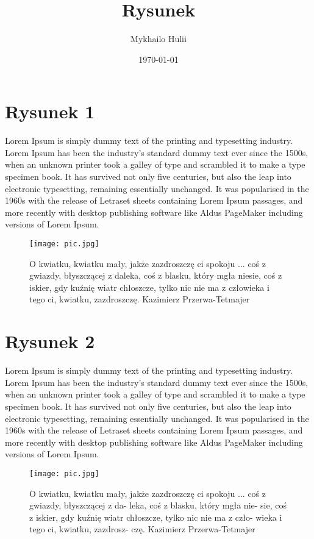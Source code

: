 \documentclass[a4paper,12pt]{article}
\title{Rysunek}
\author{Mykhailo Hulii}
\date{\today}
\begin{document}
	\maketitle
	
	
	\section{Rysunek 1}
	Lorem Ipsum is simply dummy text of the printing and typesetting industry. Lorem Ipsum has been the industry's standard dummy text ever since the 1500s, when an unknown printer took a galley of type and scrambled it to make a type specimen book. It has survived not only five centuries, but also the leap into electronic typesetting, remaining essentially unchanged. It was popularised in the 1960s with the release of Letraset sheets containing Lorem Ipsum passages, and more recently with desktop publishing software like Aldus PageMaker including versions of Lorem Ipsum.
	\begin{figure}[h]
		\centering
		\texttt{[image: pic.jpg]}
		\caption{O kwiatku, kwiatku mały, jakże zazdroszczę ci spokoju ... coś z
			gwiazdy, błyszczącej z daleka, coś z blasku, który mgła niesie, coś z iskier,
			gdy kuźnię wiatr chłoszcze, tylko nic nie ma z człowieka i tego ci, kwiatku,
			zazdroszczę. Kazimierz Przerwa-Tetmajer}
	\end{figure}
	\section{Rysunek 2}
	Lorem Ipsum is simply dummy text of the printing and typesetting industry. Lorem Ipsum has been the industry's standard dummy text ever since the 1500s, when an unknown printer took a galley of type and scrambled it to make a type specimen book. It has survived not only five centuries, but also the leap into electronic typesetting, remaining essentially unchanged. It was popularised in the 1960s with the release of Letraset sheets containing Lorem Ipsum passages, and more recently with desktop publishing software like Aldus PageMaker including versions of Lorem Ipsum.
	\begin{SCfigure}[1.1]
		\texttt{[image: pic.jpg]}
		\caption{O kwiatku, kwiatku
			mały, jakże zazdroszczę ci spokoju
			... coś z gwiazdy, błyszczącej z da-
			leka, coś z blasku, który mgła nie-
			sie, coś z iskier, gdy kuźnię wiatr
			chłoszcze, tylko nic nie ma z czło-
			wieka i tego ci, kwiatku, zazdrosz-
			czę. Kazimierz Przerwa-Tetmajer}
	\end{SCfigure}
	
\end{document}
